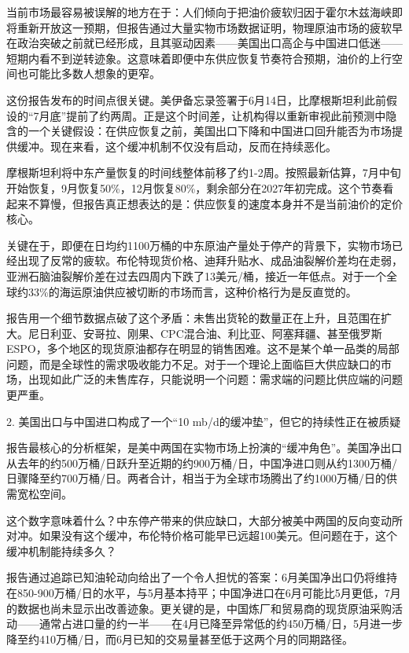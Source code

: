 \documentclass[11pt]{ctexart}
\begin{document}
当前市场最容易被误解的地方在于：人们倾向于把油价疲软归因于霍尔木兹海峡即将重新开放这一预期，但报告通过大量实物市场数据证明，物理原油市场的疲软早在政治突破之前就已经形成，且其驱动因素——美国出口高企与中国进口低迷——短期内看不到逆转迹象。这意味着即便中东供应恢复节奏符合预期，油价的上行空间也可能比多数人想象的更窄。

这份报告发布的时间点很关键。美伊备忘录签署于6月14日，比摩根斯坦利此前假设的“7月底”提前了约两周。正是这个时间差，让机构得以重新审视此前预测中隐含的一个关键假设：在供应恢复之前，美国出口下降和中国进口回升能否为市场提供缓冲。现在来看，这个缓冲机制不仅没有启动，反而在持续恶化。

摩根斯坦利将中东产量恢复的时间线整体前移了约1-2周。按照最新估算，7月中旬开始恢复，9月恢复50\%，12月恢复80\%，剩余部分在2027年初完成。这个节奏看起来不算慢，但报告真正想表达的是：供应恢复的速度本身并不是当前油价的定价核心。

关键在于，即便在日均约1100万桶的中东原油产量处于停产的背景下，实物市场已经出现了反常的疲软。布伦特现货价格、迪拜升贴水、成品油裂解价差均在走弱，亚洲石脑油裂解价差在过去四周内下跌了13美元/桶，接近一年低点。对于一个全球约33\%的海运原油供应被切断的市场而言，这种价格行为是反直觉的。

报告用一个细节数据点破了这个矛盾：未售出货轮的数量正在上升，且范围在扩大。尼日利亚、安哥拉、刚果、CPC混合油、利比亚、阿塞拜疆、甚至俄罗斯ESPO，多个地区的现货原油都存在明显的销售困难。这不是某个单一品类的局部问题，而是全球性的需求吸收能力不足。对于一个理论上面临巨大供应缺口的市场，出现如此广泛的未售库存，只能说明一个问题：需求端的问题比供应端的问题更严重。

2. 美国出口与中国进口构成了一个“10 mb/d的缓冲垫”，但它的持续性正在被质疑

报告最核心的分析框架，是美中两国在实物市场上扮演的“缓冲角色”。美国净出口从去年的约500万桶/日跃升至近期的约900万桶/日，中国净进口则从约1300万桶/日骤降至约700万桶/日。两者合计，相当于为全球市场腾出了约1000万桶/日的供需宽松空间。

这个数字意味着什么？中东停产带来的供应缺口，大部分被美中两国的反向变动所对冲。如果没有这个缓冲，布伦特价格可能早已远超100美元。但问题在于，这个缓冲机制能持续多久？

报告通过追踪已知油轮动向给出了一个令人担忧的答案：6月美国净出口仍将维持在850-900万桶/日的水平，与5月基本持平；中国净进口在6月可能比5月更低，7月的数据也尚未显示出改善迹象。更关键的是，中国炼厂和贸易商的现货原油采购活动——通常占进口量的约一半——在4月已降至异常低的约450万桶/日，5月进一步降至约410万桶/日，而6月已知的交易量甚至低于这两个月的同期路径。
\end{document}
